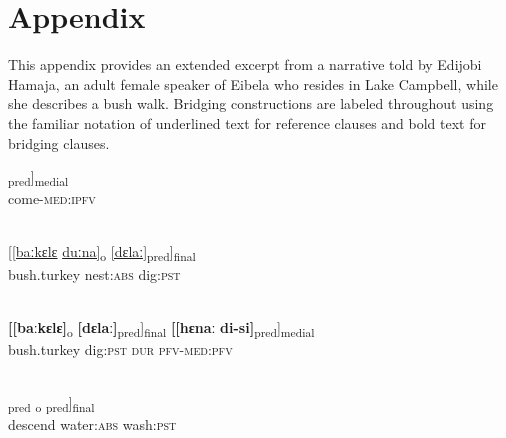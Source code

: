 \documentclass[output=paper]{LSP/langsci}
\begin{document}
\section*{Appendix}
 \setcounter{equation}{0}
This appendix provides an extended excerpt from a narrative told by Edijobi Hamaja, an adult
female speaker of Eibela who resides in Lake Campbell, while she describes a bush walk. Bridging
constructions are labeled throughout using the familiar notation of underlined text for reference clauses
and bold text for bridging clauses.

\begin{exe}
\ex \label{Aiex:App21}
\gll [[jaː-nɛː]\textsubscript{pred}]\textsubscript{medial}\\
come-\textsc{med}:\textsc{ipfv}\\
\glt {}\\
\end{exe}

\begin{exe}
\ex \label{Aiex:App22}	
\gll \underline{[[baːkɛlɛ}	\underline{duːna]}\textsubscript{o}	\underline{[dɛlaː]}\textsubscript{pred}]\textsubscript{final}\\
bush.turkey	nest:\textsc{abs}	dig:\textsc{pst}\\
‎\glt {}\\
\end{exe}

\begin{exe}
\ex \label{Aiex:App23}
\gll \textbf{[[baːkɛlɛ]}\textsubscript{o}	\textbf{[dɛlaː]}\textsubscript{pred}]\textsubscript{final}	\textbf{[[hɛnaː}	\textbf{di-si]}\textsubscript{pred}]\textsubscript{medial}\\
bush.turkey	dig:\textsc{pst}		\textsc{dur}	\textsc{pfv}-\textsc{med}:\textsc{pfv}\\
‎‎\glt {}\\
\end{exe}

\begin{exe}
\ex \label{Aiex:App24}
\gll [[tilaː]\textsubscript{pred}	\underline{\smash{[haːnaː]}}\textsubscript{o}	\underline{\smash{[muːduː]}}\textsubscript{pred}]\textsubscript{final}\\
descend	water:\textsc{abs}	wash:\textsc{pst}\\
\glt {}\\
\end{exe}
\end{document}
